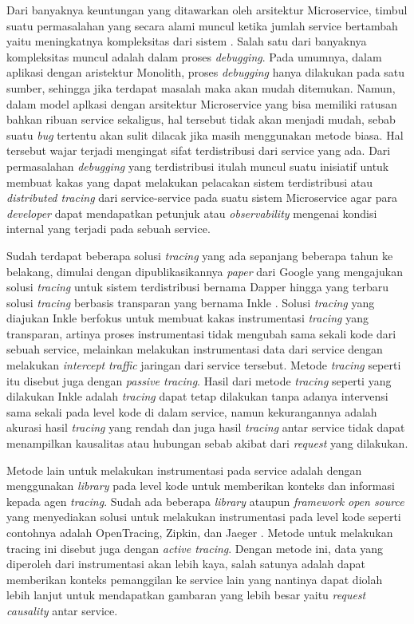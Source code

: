 Dari banyaknya keuntungan yang ditawarkan oleh arsitektur Microservice, timbul suatu permasalahan yang secara alami muncul ketika jumlah service bertambah yaitu meningkatnya kompleksitas dari sistem \citep{fowler-complexity}. Salah satu dari banyaknya kompleksitas muncul adalah dalam proses \textit{debugging}. Pada umumnya, dalam aplikasi dengan aristektur Monolith, proses \textit{debugging} hanya dilakukan pada satu sumber, sehingga jika terdapat masalah maka akan mudah ditemukan. Namun, dalam model aplkasi dengan arsitektur Microservice yang bisa memiliki ratusan bahkan ribuan service sekaligus, hal tersebut tidak akan menjadi mudah, sebab suatu \textit{bug} tertentu akan sulit dilacak jika masih menggunakan metode biasa. Hal tersebut wajar terjadi mengingat sifat terdistribusi dari service yang ada. Dari permasalahan \textit{debugging} yang terdistribusi itulah muncul suatu inisiatif untuk membuat kakas yang dapat melakukan pelacakan sistem terdistribusi atau \textit{distributed tracing} dari service-service pada suatu sistem Microservice agar para \textit{developer} dapat mendapatkan petunjuk atau \textit{observability} mengenai kondisi internal yang terjadi pada sebuah service.

Sudah terdapat beberapa solusi \textit{tracing} yang ada sepanjang beberapa tahun ke belakang, dimulai dengan dipublikasikannya \textit{paper} dari Google yang mengajukan solusi \textit{tracing} untuk sistem terdistribusi bernama Dapper \citep{dapper-paper} hingga yang terbaru solusi \textit{tracing} berbasis transparan yang bernama Inkle \citep{tracing-abram}. Solusi \textit{tracing} yang diajukan Inkle berfokus untuk membuat kakas instrumentasi \textit{tracing} yang transparan, artinya proses instrumentasi tidak mengubah sama sekali kode dari sebuah service, melainkan melakukan instrumentasi data dari service dengan melakukan \textit{intercept} \textit{traffic} jaringan dari service tersebut. Metode \textit{tracing} seperti itu disebut juga dengan \textit{passive tracing}. Hasil dari metode \textit{tracing} seperti yang dilakukan Inkle adalah \textit{tracing} dapat tetap dilakukan tanpa adanya intervensi sama sekali pada level kode di dalam service, namun kekurangannya adalah akurasi hasil \textit{tracing} yang rendah dan juga hasil \textit{tracing} antar service tidak dapat menampilkan kausalitas atau hubungan sebab akibat dari \textit{request} yang dilakukan.

Metode lain untuk melakukan instrumentasi pada service adalah dengan menggunakan \textit{library} pada level kode untuk memberikan konteks dan informasi kepada agen \textit{tracing}. Sudah ada beberapa \textit{library} ataupun \textit{framework} \textit{open source} yang menyediakan solusi untuk melakukan instrumentasi pada level kode seperti contohnya adalah OpenTracing, Zipkin, dan Jaeger \citep{opentracing, zipkin, jaeger}. Metode untuk melakukan tracing ini disebut juga dengan \textit{active tracing}. Dengan metode ini, data yang diperoleh dari instrumentasi akan lebih kaya, salah satunya adalah dapat memberikan konteks pemanggilan ke service lain yang nantinya dapat diolah lebih lanjut untuk mendapatkan gambaran yang lebih besar yaitu \textit{request causality} antar service.

